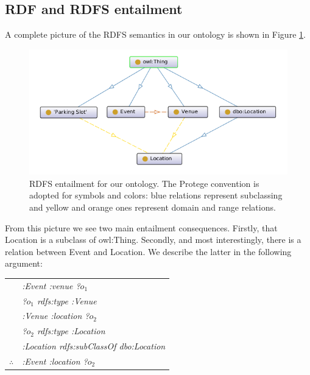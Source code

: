 \documentclass[runningheads,a4paper]{../../StyleFiles/llncs}
\begin{document}
\subsection{RDF and RDFS entailment}
A complete picture of the RDFS semantics in our ontology is shown in Figure \ref{fig:rdfs-entailment}.

\begin{figure}[h]
	\centering
	\includegraphics[width=1\textwidth]{img/ontology-classes.png}
	\caption{RDFS entailment for our ontology. The Protege convention is adopted
		for symbols and colors: blue relations represent subclassing and yellow and
		orange ones represent domain and range relations.}
	\label{fig:rdfs-entailment}
\end{figure}

From this picture we see two main entailment consequences. Firstly, that Location is a subclass of owl:Thing. Secondly, and most interestingly, there is a relation between Event and Location. We describe the latter in the following argument:

\begin{center}
	\begin{tabular}{c@{\,}l@{}} 
		& \textit{:Event 		:venue 				?$o_1$} \\
		& \textit{?$o_1$ 		rdfs:type 			:Venue} \\   
		& \textit{:Venue 		:location 			?$o_2$} \\ 
		& \textit{?$o_2$ 		rdfs:type 			:Location} \\ 
		& \textit{:Location		rdfs:subClassOf 	dbo:Location} \\
		\arrayrulecolor{blue} \cline{2-2}
		$\therefore$         
		& \textit{:Event 		:location 				?$o_2$} \\
	\end{tabular}
\end{center}
\end{document}

